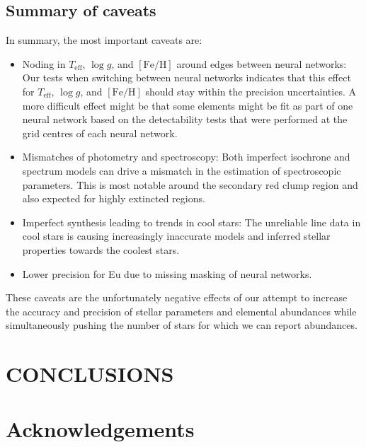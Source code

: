 \documentclass[
  journal=pasa,
  manuscript=research-paper, %
  year=2023,
  volume=37
]{cup-journal}
\newcommand{\Teff}{$T_\mathrm{eff}$\xspace}
\newcommand{\logg}{$\log g$\xspace}
\newcommand{\feh}{$\mathrm{[Fe/H]}$\xspace}
\newcommand{\TLF}{\Teff, \logg, and \feh}
\begin{document}
\subsection{Summary of caveats} \label{sec:caveats_summary}

In summary, the most important caveats are:
\begin{itemize}
    \item Noding in \TLF around edges between neural networks: Our tests when switching between neural networks indicates that this effect for \TLF should stay within the precision uncertainties. A more difficult effect might be that some elements might be fit as part of one neural network based on the detectability tests that were performed at the grid centres of each neural network.
    \item Mismatches of photometry and spectroscopy: Both imperfect isochrone and spectrum models can drive a mismatch in the estimation of spectroscopic parameters. This is most notable around the secondary red clump region and also expected for highly extincted regions.
    \item Imperfect synthesis leading to trends in cool stars: The unreliable line data in cool stars is causing increasingly inaccurate models and inferred stellar properties towards the coolest stars.
    \item Lower precision for Eu due to missing masking of neural networks.
\end{itemize}

These caveats are the unfortunately negative effects of our attempt to increase the accuracy and precision of stellar parameters and elemental abundances while simultaneously pushing the number of stars for which we can report abundances.

\section{CONCLUSIONS}
\label{sec:conclusion}




\section*{Acknowledgements}
\end{document}
